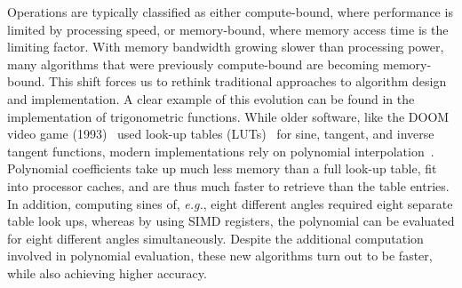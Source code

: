 \normalcaptionwidth
\captionwidth{\linewidth}
\begin{figure}[h]
    \centering

    \hspace{0.025\textwidth}%
    \begin{minipage}[t]{0.42\textwidth}
      \centering
      \label{fig:in:memory-wall}
    \end{minipage}%
    \hspace{0.03\textwidth}%
    \begin{minipage}[t]{0.42\textwidth}
      \centering
      \label{fig:in:nvidia-gpus}
    \end{minipage}%
    \vspace{-0.3cm}
\end{figure}
\changecaptionwidth
{}

Operations are typically classified as either compute-bound, where performance is limited by processing speed, or memory-bound, where memory access time is the limiting factor. With memory bandwidth growing slower than processing power, many algorithms that were previously compute-bound are becoming memory-bound. This shift forces us to rethink traditional approaches to algorithm design and implementation. A clear example of this evolution can be found in the implementation of trigonometric functions. While older software, like the DOOM video game (1993)~ used look-up tables (LUTs)~ for sine, tangent, and inverse tangent functions, modern implementations rely on polynomial interpolation~. Polynomial coefficients take up much less memory than a full look-up table, fit into processor caches, and are thus much faster to retrieve than the table entries. In addition, computing sines of, \textit{e.g.}, eight different angles required eight separate table look ups, whereas by using SIMD registers, the polynomial can be evaluated for eight different angles simultaneously. Despite the additional computation involved in polynomial evaluation, these new algorithms turn out to be faster, while also achieving higher accuracy.

